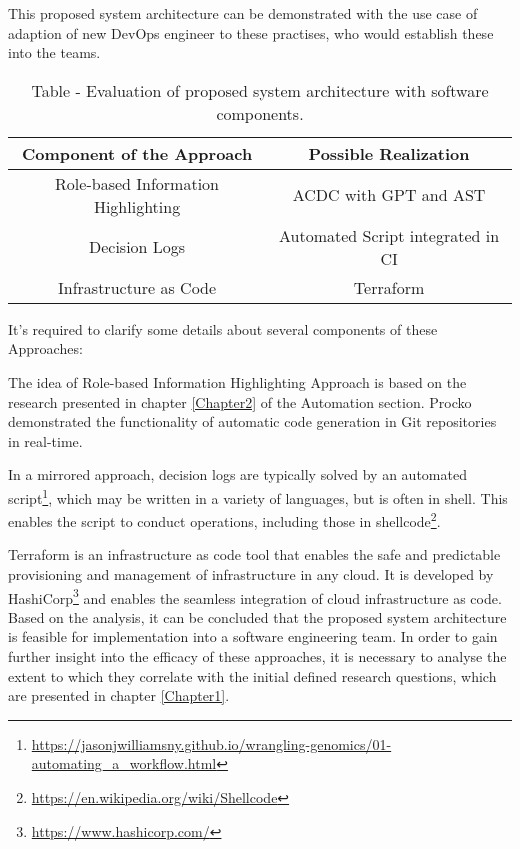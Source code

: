 This proposed system architecture can be demonstrated with the use case of adaption of new \ac{DevOps} engineer to these practises, who would establish these into the teams. 

\begin{table}[h!]
\begin{tabular}{|c|c|}
\hline
\textbf{Component of the Approach}  & \textbf{Possible Realization}   \\[1ex]
\hline
Role-based Information Highlighting & \ac{ACDC} with \ac{GPT} and \ac{AST}    \\[1ex]
\hline
Decision Logs  &  Automated Script integrated in \ac{CI}  \\[1ex]
\hline
Infrastructure as Code &   Terraform \\[1ex]
\hline
\end{tabular}
\caption{Table - Evaluation of proposed system architecture with software components.}
\label{table:1}
\end{table}

It's required to clarify some details about several components of these Approaches:

The idea of Role-based Information Highlighting Approach is based on the research presented in chapter \ref{Chapter2} of the Automation section. Procko \cite{Procko2024CodeDocumentation} demonstrated the functionality of automatic code generation in Git repositories in real-time.

In a mirrored approach, decision logs are typically solved by an automated script\footnote{\url{https://jasonjwilliamsny.github.io/wrangling-genomics/01-automating_a_workflow.html}}, which may be written in a variety of languages, but is often in shell. This enables the script to conduct operations, including those in shellcode\footnote{\url{https://en.wikipedia.org/wiki/Shellcode}}.

Terraform is an infrastructure as code tool that enables the safe and predictable provisioning and management of infrastructure in any cloud. It is developed by HashiCorp\footnote{\url{https://www.hashicorp.com/}} and enables the seamless integration of cloud infrastructure as code.
Based on the analysis, it can be concluded that the proposed system architecture is feasible for implementation into a software engineering team. In order to gain further insight into the efficacy of these approaches, it is necessary to analyse the extent to which they correlate with the initial defined research questions, which are presented in chapter \ref{Chapter1}.

